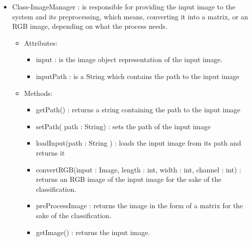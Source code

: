 \documentclass[parskip=full]{scrartcl}
\begin{document}
\pagebreak



\begin{itemize}
	\item Class-ImageManager : is responsible for providing the input image to the system and its preprocessing, which means, converting it into a matrix, or an RGB image, depending on what the process needs.
	\begin{itemize}
		\item Attributes:
		\begin{itemize}
			\item input  : is the image object representation of the input image.
			\item inputPath : is a String which contains the path to the input image
		\end{itemize}
		\item Methods:
		\begin{itemize}
			\item getPath() : returns a string containing the path to the input image
			\item setPath( path : String) : sets the path of the input image
			\item loadInput(path  : String ) : loads the input image from its path and returns it
			\item convertRGB(input : Image, length : int, width : int, channel : int) : returns an RGB image of the input image for the sake of the classification.
			\item preProcessImage : returns the image in the form of a matrix for the sake of the classification.
			\item getImage() : returns the input image.
		\end{itemize}
	\end{itemize}
\end{itemize}



\pagebreak
\end{document}
